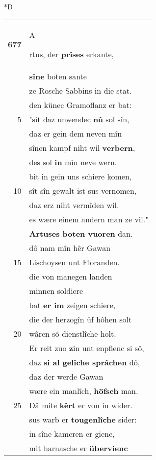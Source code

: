 \documentclass[8pt,a4paper,notitlepage]{article}
\begin{document}
\begin{table}[ht]
\begin{minipage}[t]{0.5\linewidth}
\small
\begin{center}*D
\end{center}
\begin{tabular}{rl}
\textbf{677} & \begin{large}A\end{large}rtus, der \textbf{prîses} erkante,\\ 
 & \textbf{sîne} boten sante\\ 
 & ze Rosche Sabbins in die stat.\\ 
 & den künec Gramoflanz er bat:\\ 
5 & "sît daz unwendec \textbf{nû} sol sîn,\\ 
 & daz er gein dem neven mîn\\ 
 & sînen kampf niht wil \textbf{verbern},\\ 
 & des sol \textbf{in} mîn neve wern.\\ 
 & bit in gein uns schiere komen,\\ 
10 & sît sîn gewalt ist sus vernomen,\\ 
 & daz erz niht vermîden wil.\\ 
 & es wære einem andern man ze vil."\\ 
 & \textbf{Artuses boten vuoren} dan.\\ 
 & dô nam mîn hêr Gawan\\ 
15 & Lischoysen unt Floranden.\\ 
 & die von manegen landen\\ 
 & minnen soldiere\\ 
 & bat \textbf{er im} zeigen schiere,\\ 
 & die der herzogîn ûf hôhen solt\\ 
20 & wâren sô dienstlîche holt.\\ 
 & Er reit zuo \textbf{z}in unt enpfienc si sô,\\ 
 & daz \textbf{si al gelîche sprâchen} dô,\\ 
 & daz der werde Gawan\\ 
 & wære ein manlîch, \textbf{höfsch} man.\\ 
25 & Dâ mite \textbf{kêrt} er von in wider.\\ 
 & sus warb er \textbf{tougenlîche} sider:\\ 
 & in sîne kameren er gienc,\\ 
 & mit harnasche er \textbf{übervienc}\\ 

\end{tabular}
\end{minipage}
\end{table}
\end{document}
